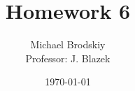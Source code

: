 


\title{Homework 6}
\date{\today}
\author{Michael Brodskiy\\ \small Professor: J. Blazek}



\maketitle

